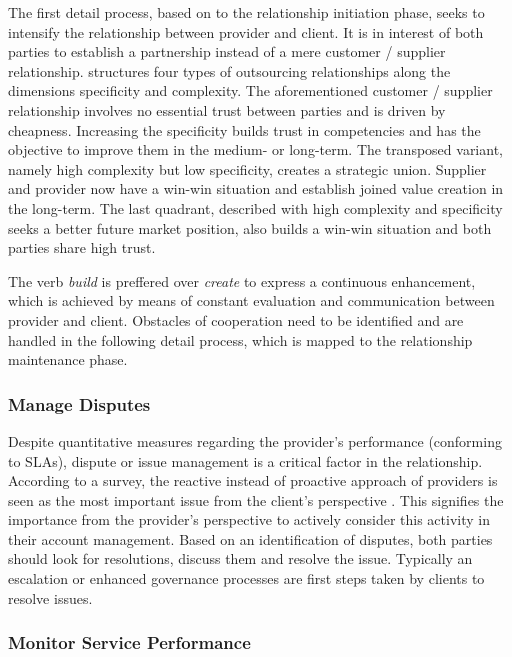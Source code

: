 	The first detail process, based on to the relationship initiation phase, seeks to intensify the relationship between provider and client. It is in interest of both parties to establish a partnership instead of a mere customer / supplier relationship. \cite{Franceschini_2003} structures four types of outsourcing relationships along the dimensions specificity and complexity. The aforementioned customer / supplier relationship involves no essential trust between parties and is driven by cheapness. Increasing the specificity builds trust in competencies and has the objective to improve them in the medium- or long-term. The transposed variant, namely high complexity but low specificity, creates a strategic union. Supplier and provider now have a win-win situation and establish joined value creation in the long-term. The last quadrant, described with high complexity and specificity seeks a better future market position, also builds a win-win situation and both parties share high trust. 
	
	The verb \textit{build} is preffered over \textit{create} to express a continuous enhancement, which is achieved by means of constant evaluation and communication between provider and client. Obstacles of cooperation need to be identified and are handled in the following detail process, which is mapped to the relationship maintenance phase. 
	
	\subsubsection{Manage Disputes}
	
	Despite quantitative measures regarding the provider's performance (\eg conforming to \acrshort{SLA}s), dispute or issue management is a critical factor in the relationship. According to a survey, the reactive instead of proactive approach of providers is seen as the most important issue from the client's perspective \citep{deloitte2014outsourcing}. This signifies the importance from the provider's perspective to actively consider this activity in their account management. Based on an identification of disputes, both parties should look for resolutions, discuss them and resolve the issue. Typically an escalation or enhanced governance processes are first steps taken by clients to resolve issues.
	
	\subsubsection{Monitor Service Performance}
	
